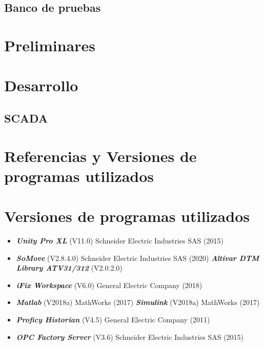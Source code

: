 \documentclass[12pt,a4paper]{article}
\begin{document}
\subsection{Banco de pruebas}

\section{Preliminares}

	
\section{Desarrollo}





\subsection{SCADA}


\clearpage
\newpage


\clearpage
\newpage
\section{Referencias y Versiones de programas utilizados}


\printbibliography

\section*{Versiones de programas utilizados}

\begin{itemize}
	\item \textbf{\textit{Unity Pro XL}} (V11.0) Schneider Electric Industries SAS (2015) 
	\item \textbf{\textit{SoMove}} (V2.8.4.0) Schneider Electric Industries SAS (2020)  
	\subitem \textbf{\textit{Altivar DTM Library ATV31/312}} (V2.0.2.0) 
	\item \textbf{\textit{iFix Workspace}} (V6.0) General Electric Company (2018) 
	\item \textbf{\textit{Matlab}} (V2018a) MathWorks (2017)
	\subitem \textbf{\textit{Simulink}}  (V2018a) MathWorks (2017)
	
	\item \textbf{\textit{Proficy Historian}} (V4.5) General Electric Company (2011) 
	\item \textbf{\textit{OPC Factory Server}} (V3.6) Schneider Electric Industries SAS (2015)
	
\end{itemize}
\newpage
\appendix
\clearpage
\appendix


\end{document}
